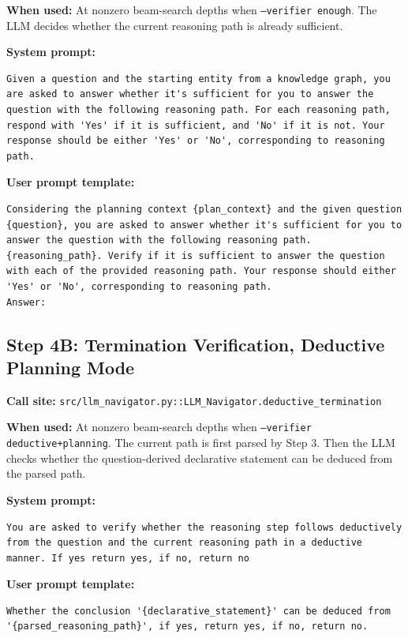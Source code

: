 \documentclass[11pt]{article}
\begin{document}
\textbf{When used:} At nonzero beam-search depths when \texttt{--verifier enough}.
The LLM decides whether the current reasoning path is already sufficient.

\textbf{System prompt:}
\begin{lstlisting}[style=prompt]
Given a question and the starting entity from a knowledge graph, you are asked to answer whether it's sufficient for you to answer the question with the following reasoning path. For each reasoning path, respond with 'Yes' if it is sufficient, and 'No' if it is not. Your response should be either 'Yes' or 'No', corresponding to reasoning path.
\end{lstlisting}

\textbf{User prompt template:}
\begin{lstlisting}[style=prompt]
Considering the planning context {plan_context} and the given question {question}, you are asked to answer whether it's sufficient for you to answer the question with the following reasoning path. {reasoning_path}. Verify if it is sufficient to answer the question with each of the provided reasoning path. Your response should either 'Yes' or 'No', corresponding to reasoning path. 
Answer:
\end{lstlisting}

\subsection{Step 4B: Termination Verification, Deductive Planning Mode}

\textbf{Call site:} \texttt{src/llm\_navigator.py::LLM\_Navigator.deductive\_termination}

\textbf{When used:} At nonzero beam-search depths when
\texttt{--verifier deductive+planning}. The current path is first parsed by Step
3. Then the LLM checks whether the question-derived declarative statement can be
deduced from the parsed path.

\textbf{System prompt:}
\begin{lstlisting}[style=prompt]
You are asked to verify whether the reasoning step follows deductively from the question and the current reasoning path in a deductive manner. If yes return yes, if no, return no
\end{lstlisting}

\textbf{User prompt template:}
\begin{lstlisting}[style=prompt]
Whether the conclusion '{declarative_statement}' can be deduced from '{parsed_reasoning_path}', if yes, return yes, if no, return no.
\end{lstlisting}
\end{document}
